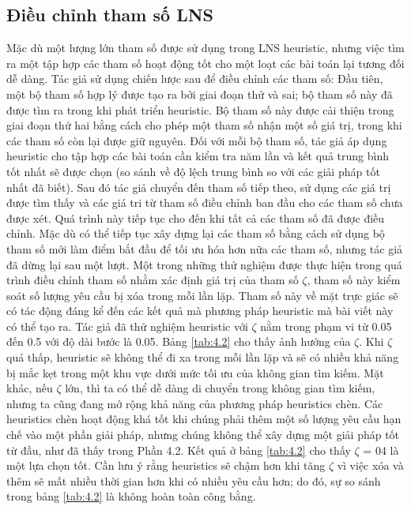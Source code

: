 \subsection{Điều chỉnh tham số LNS}
Mặc dù một lượng lớn tham số được sử dụng trong LNS heuristic, nhưng việc tìm ra một tập hợp các tham số hoạt động tốt cho một loạt các bài toán lại tương đối dễ dàng. Tác giả sử dụng chiến lược sau để điều chỉnh các tham số: Đầu tiên, một bộ tham số hợp lý được tạo ra bởi giai đoạn thử và sai; bộ tham số này đã được tìm ra trong khi phát triển heuristic. Bộ tham số này được cải thiện trong giai đoạn thứ hai bằng cách cho phép một tham số nhận một số giá trị, trong khi các tham số còn lại được giữ nguyên. Đối với mỗi bộ tham số, tác giả áp dụng heuristic cho tập hợp các bài toán cần kiểm tra năm lần và kết quả trung bình tốt nhất sẽ được chọn (so sánh về độ lệch trung bình so với các giải pháp tốt nhất đã biết). Sau đó tác giả chuyển đến tham số tiếp theo, sử dụng các giá trị được tìm thấy và các giá tri từ tham số điều chỉnh ban đầu cho các tham số chưa được xét. Quá trình này tiếp tục cho đến khi tất cả các tham số đã được điều chỉnh. Mặc dù có thể tiếp tục xây dựng lại các tham số bằng cách sử dụng bộ tham số mới làm điểm bắt đầu để tối ưu hóa hơn nữa các tham số, nhưng tác giả đã dừng lại sau một lượt.
Một trong những thử nghiệm được thực hiện trong quá trình điều chỉnh tham số nhằm xác định giá trị của tham số $\zeta$, tham số này kiểm soát số lượng yêu cầu bị xóa trong mỗi lần lặp. Tham số này về mặt trực giác sẽ có tác động đáng kể đến các kết quả mà phương pháp heuristic mà bài viết này có thể tạo ra. Tác giả đã thử nghiệm heuristic với $\zeta$ nằm trong phạm vi từ 0.05 đến 0.5 với độ dài bước là 0.05. Bảng \ref{tab:4.2} cho thấy ảnh hưởng của $\zeta$. Khi $\zeta$ quá thấp, heuristic sẽ không thể đi xa trong mỗi lần lặp và sẽ có nhiều khả năng bị mắc kẹt trong một khu vực dưới mức tối ưu của không gian tìm kiếm. Mặt khác, nếu $\zeta$ lớn, thì ta có thể dễ dàng di chuyển trong không gian tìm kiếm, nhưng ta cũng đang mở rộng khả năng của phương pháp heuristics chèn. Các heuristics chèn hoạt động khá tốt khi chúng phải thêm một số lượng yêu cầu hạn chế vào một phần giải pháp, nhưng chúng không thể xây dựng một giải pháp tốt từ đầu, như đã thấy trong Phần 4.2. Kết quả ở bảng \ref{tab:4.2} cho thấy $\zeta$ = 04 là một lựa chọn tốt. Cần lưu ý rằng heuristics sẽ chậm hơn khi tăng $\zeta$ vì việc xóa và thêm sẽ mất nhiều thời gian hơn khi có nhiều yêu cầu hơn; do đó, sự so sánh trong bảng \ref{tab:4.2} là không hoàn toàn công bằng.

